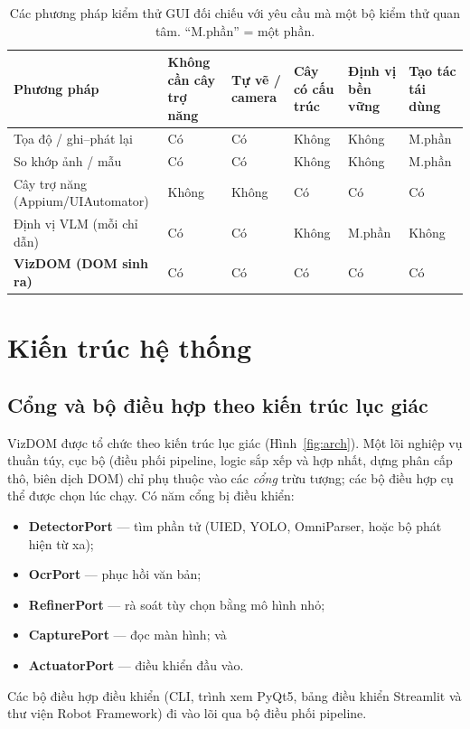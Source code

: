 \documentclass[11pt,a4paper]{article}
\begin{document}
\begin{table}[H]
  \centering\footnotesize
  \caption{Các phương pháp kiểm thử GUI đối chiếu với yêu cầu mà một bộ kiểm thử quan
  tâm. ``M.phần'' = một phần.}
  \label{tab:methods}
  \begin{tabular}{@{}p{3.0cm}p{1.7cm}p{1.6cm}p{1.6cm}p{1.6cm}p{1.5cm}@{}}
    \toprule
    Phương pháp & Không cần cây trợ năng & Tự vẽ / camera & Cây có cấu trúc & Định vị bền vững & Tạo tác tái dùng \\
    \midrule
    Tọa độ / ghi--phát lại & Có & Có & Không & Không & M.phần \\
    So khớp ảnh / mẫu & Có & Có & Không & Không & M.phần \\
    Cây trợ năng (Appium/UIAutomator) & Không & Không & Có & Có & Có \\
    Định vị VLM (mỗi chỉ dẫn) & Có & Có & Không & M.phần & Không \\
    \textbf{VizDOM (DOM sinh ra)} & Có & Có & Có & Có & Có \\
    \bottomrule
  \end{tabular}
\end{table}

\section{Kiến trúc hệ thống}
\label{sec:arch}

\subsection{Cổng và bộ điều hợp theo kiến trúc lục giác}
VizDOM được tổ chức theo kiến trúc lục giác (Hình~\ref{fig:arch}). Một lõi nghiệp vụ
thuần túy, cục bộ (điều phối pipeline, logic sắp xếp và hợp nhất, dựng phân cấp thô,
biên dịch DOM) chỉ phụ thuộc vào các \emph{cổng} trừu tượng; các bộ điều hợp cụ thể
được chọn lúc chạy. Có năm cổng bị điều khiển:
\begin{itemize}[leftmargin=1.4em]
  \item \textbf{DetectorPort} --- tìm phần tử (UIED, YOLO, OmniParser, hoặc bộ phát
        hiện từ xa);
  \item \textbf{OcrPort} --- phục hồi văn bản;
  \item \textbf{RefinerPort} --- rà soát tùy chọn bằng mô hình nhỏ;
  \item \textbf{CapturePort} --- đọc màn hình; và
  \item \textbf{ActuatorPort} --- điều khiển đầu vào.
\end{itemize}
Các bộ điều hợp điều khiển (CLI, trình xem PyQt5, bảng điều khiển Streamlit và thư
viện Robot Framework) đi vào lõi qua bộ điều phối pipeline.
\end{document}
